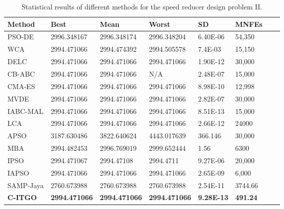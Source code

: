 
\begin{table*}[tp]
    \tiny
    \begin{center}
    
    \begin{tabular}{ P{2.0cm} P{2.0cm} P{2.0cm} P{2.0cm} P{2.0cm} P{2.0cm} P{2.0cm} P{2.0cm}  }
    \hline
    \textbf{Method} & \textbf{Best} & \textbf{Mean} & \textbf{Worst} & \textbf{SD} & \textbf{MNFEs} \\
    \hline
    
    PSO-DE & 2996.348167 & 2996.348174 & 2996.348204 & 6.40E-06 & 54,350 \\
    WCA & 2994.471066 & 2994.474392 & 2994.505578 & 7.4E-03 & 15,150 \\    
    DELC & 2994.471066 & 2994.471066 & 2994.471066 & 1.90E-12 & 30,000 \\
    CB-ABC & 2994.471066 & 2994.471066 & N/A & 2.48E-07 & 15,000 \\
    CMA-ES & 2994.471066 & 2994.471066 & 2994.471066 & 8.98E-10 & 12,998 \\
    MVDE & 2994.471066 & 2994.471066 & 2994.471066 & 2.82E-07 & 30,000 \\    
    IABC-MAL & 2994.471066 & 2994.471066 & 2994.471066 & 8.51E-13 & 15,000 \\ 
    LCA & 2994.471066 & 2994.471066 & 2994.471066 & 2.66E-12 & 24000 \\
    APSO & 3187.630486 & 3822.640624 & 4443.017639 & 366.146 & 30,000 \\
    MBA & 2994.482453 & 2996.769019 & 2999.652444 & 1.56 & 6300 \\
    IPSO & 2994.471067 & 2994.47108 & 2994.4711 & 9.27E-06 & 20,000 \\
    IAPSO & 2994.471066 & 2994.471066 & 2994.471066 & 2.65E-09 & 6,000 \\
    SAMP-Jaya & 2760.673988 & 2760.673988 & 2760.673988 & 2.54E-11 & 3744.66 \\    
    \textbf{C-ITGO} & \bf{2994.471066} & \bf{2994.471066} & \bf{2994.471066} & \bf{9.28E-13} & \bf{491.24} \\ 
    
  

    \hline
    \end{tabular}
    \end{center}
    \vspace*{-6mm}
    \caption{Statistical results of different methods for the speed reducer design problem II. \\[1em]}
    \label{tab:SP2}
    \end{table*}
    
    